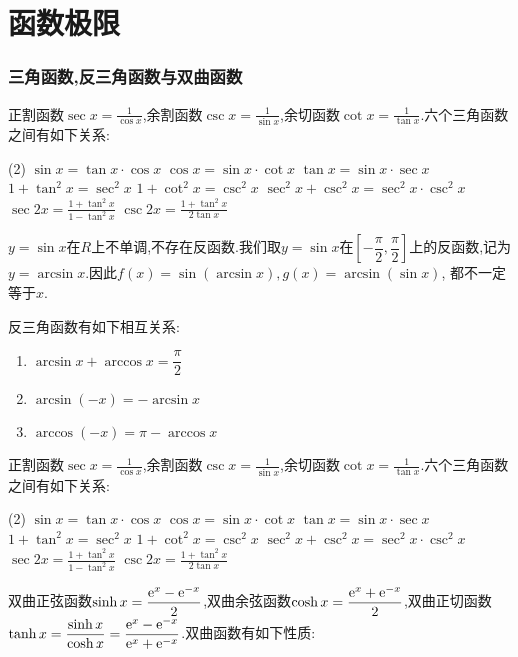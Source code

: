 \chapter{函数极限}

\subsection*{三角函数,反三角函数与双曲函数}

正割函数$\sec x = \frac{1}{\cos x}$,余割函数$\csc x = \frac{1}{\sin x}$,余切函数$\cot x = \frac{1}{\tan x}$.六个三角函数之间有如下关系:

\begin{tasks}[label=(\arabic*)](2)
    \task $\sin x = \tan x \cdot \cos x$
    \task $\cos x = \sin x \cdot \cot x$
    \task $\tan x = \sin x \cdot \sec x$
    \task $1 + \tan^2 x = \sec^2 x$
    \task $1 + \cot^2 x = \csc^2 x$
    \task $\sec^2 x + \csc^2 x = \sec^2 x \cdot \csc^2 x$
    \task $\sec 2x = \frac{1+\tan^2 x}{1-\tan^2 x}$
    \task $\csc 2x = \frac{1+\tan^2 x}{2\tan x} $
\end{tasks}

$y=\sin x$在$R$上不单调,不存在反函数.我们取$y=\sin x$在$[-\dfrac{\pi}{2},\dfrac{\pi}{2}]$上的反函数,记为$y=\arcsin x$.因此$f(x) = \sin (\arcsin x) ,g(x) = \arcsin (\sin x)$, 都不一定等于$x$.

反三角函数有如下相互关系:

\begin{enumerate}[(1)]
    \item $\arcsin x + \arccos x = \dfrac{\pi}{2}$
    \item $\arcsin(-x) = -\arcsin x$
    \item $\arccos(-x) = \pi - \arccos x$
\end{enumerate}

正割函数$\sec x = \frac{1}{\cos x}$,余割函数$\csc x = \frac{1}{\sin x}$,余切函数$\cot x = \frac{1}{\tan x}$.六个三角函数之间有如下关系:

\begin{tasks}[label=(\arabic*)](2)
    \task $\sin x = \tan x \cdot \cos x$
    \task $\cos x = \sin x \cdot \cot x$
    \task $\tan x = \sin x \cdot \sec x$
    \task $1 + \tan^2 x = \sec^2 x$
    \task $1 + \cot^2 x = \csc^2 x$
    \task $\sec^2 x + \csc^2 x = \sec^2 x \cdot \csc^2 x$
    \task $\sec 2x = \frac{1+\tan^2 x}{1-\tan^2 x}$
    \task $\csc 2x = \frac{1+\tan^2 x}{2\tan x} $
\end{tasks}

双曲正弦函数$\sinh x = \dfrac{\mathrm{e}^x - \mathrm{e}^{-x}}{2}$,双曲余弦函数$\cosh x = \dfrac{\mathrm{e}^x + \mathrm{e}^{-x}}{2}$,双曲正切函数$\tanh x = \dfrac{\sinh x}{\cosh x} = \dfrac{\mathrm{e}^x - \mathrm{e}^{-x}}{\mathrm{e}^x + \mathrm{e}^{-x}}$.双曲函数有如下性质:

